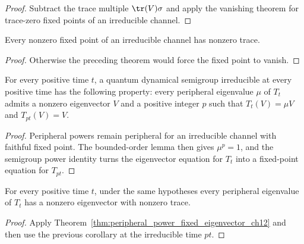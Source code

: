 \begin{proof}
    \leanok
    Subtract the trace multiple $\tr(V) \sigma$ and apply the vanishing theorem for
    trace-zero fixed points of an irreducible channel.
\end{proof}

\begin{corollary}
    \label{cor:trace_ne_zero_fixedpoint_irreducible_channel_ch12}
    \leanok
    Every nonzero fixed point of an irreducible channel has nonzero trace.
\end{corollary}

\begin{proof}
    \leanok
    Otherwise the preceding theorem would force the fixed point to vanish.
\end{proof}

\begin{theorem}
    \label{thm:peripheral_power_fixed_eigenvector_ch12}
    \leanok
    For every positive time $t$, a quantum dynamical semigroup irreducible at every
    positive time has the following property: every peripheral eigenvalue $\mu$ of $T_t$
    admits a nonzero eigenvector $V$ and a positive integer $p$ such that
    $T_t(V)=\mu V$ and $T_{pt}(V)=V$.
\end{theorem}

\begin{proof}
    \leanok
    Peripheral powers remain peripheral for an irreducible channel with faithful fixed point.
    The bounded-order lemma then gives $\mu^p=1$, and the semigroup power identity turns the
    eigenvector equation for $T_t$ into a fixed-point equation for $T_{pt}$.
\end{proof}

\begin{theorem}
    \label{thm:peripheral_trace_ne_zero_eigenvector_ch12}
    \leanok
    For every positive time $t$, under the same hypotheses every peripheral eigenvalue
    of $T_t$ has a nonzero eigenvector with nonzero trace.
\end{theorem}

\begin{proof}
    \leanok
    Apply Theorem~\ref{thm:peripheral_power_fixed_eigenvector_ch12} and then use the previous
    corollary at the irreducible time $pt$.
\end{proof}

